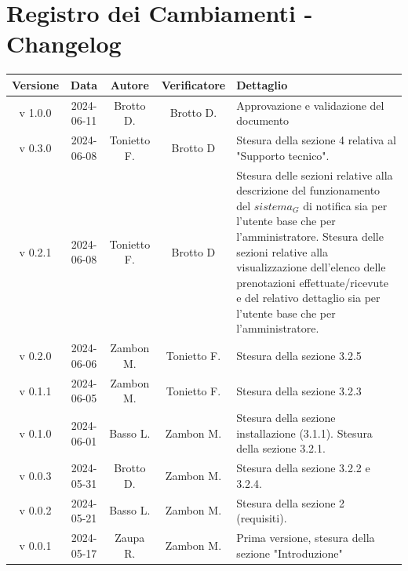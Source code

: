 \documentclass[12pt, oneside]{article}
\begin{document}
\section*{Registro dei Cambiamenti - Changelog}
\begin{longtable}{|c|c|c|c|p{7cm}|}
\hline
\textbf{Versione} & \textbf{Data} & \textbf{Autore} & \textbf{Verificatore} & 
\textbf{Dettaglio} \\
\hline
v 1.0.0 & 2024-06-11 & Brotto D. & Brotto D. & Approvazione e validazione del documento \\
\hline
v 0.3.0 & 2024-06-08 & Tonietto F. & Brotto D & Stesura della sezione 4 relativa al "Supporto tecnico". \\
\hline
v 0.2.1 & 2024-06-08 & Tonietto F. & Brotto D & Stesura delle sezioni relative alla descrizione del funzionamento del $\textit{sistema}_G$ di notifica sia per l'utente base che per l'amministratore. \newline Stesura delle sezioni relative alla visualizzazione dell'elenco delle prenotazioni effettuate/ricevute e del relativo dettaglio sia per l'utente base che per l'amministratore. \\
\hline
v 0.2.0 & 2024-06-06 & Zambon M. & Tonietto F. & Stesura della sezione 3.2.5 \\
\hline
v 0.1.1 & 2024-06-05 & Zambon M. & Tonietto F. & Stesura della sezione 3.2.3 \\
\hline
v 0.1.0 & 2024-06-01 & Basso L. & Zambon M. & Stesura della sezione installazione (3.1.1). Stesura della sezione 3.2.1. \\
\hline
v 0.0.3 & 2024-05-31 & Brotto D. & Zambon M. & Stesura della sezione 3.2.2 e 3.2.4. \\
\hline
v 0.0.2 & 2024-05-21 & Basso L. & Zambon M. & Stesura della sezione 2 (requisiti). \\
\hline
v 0.0.1 & 2024-05-17 & Zaupa R. & Zambon M. & Prima versione, stesura della sezione "Introduzione" \\
\hline
\end{longtable}
\newpage

\tableofcontents
\newpage


\newpage


\newpage


\newpage


\newpage


\newpage
\end{document}
